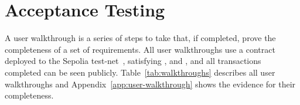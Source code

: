
\section{Acceptance Testing}\label{sec:acc-tests}

A user walkthrough is a series of steps to take that, if completed, prove the completeness of a set of requirements. 
All user walkthroughs use a contract deployed to the Sepolia test-net~\cite{etherscanio_library_nodate}, satisfying ,  and , and all transactions completed can be seen publicly.
\x
Table~\ref{tab:walkthroughs} describes all user walkthroughs and Appendix~\ref{app:user-walkthrough} shows the evidence for their completeness.

\newcommand{\p}[1]{$P_{#1}$}
\newcommand{\g}[1]{$G_{#1}$}

